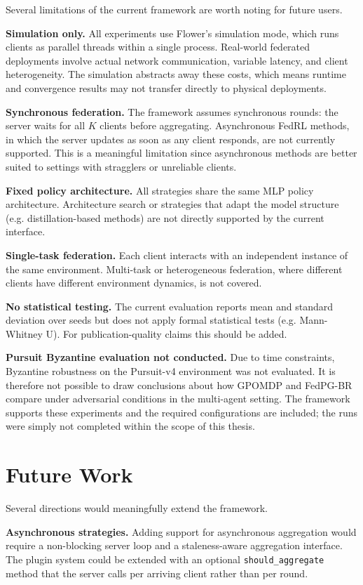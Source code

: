\documentclass[a4paper, oneside]{discothesis}
\begin{document}
Several limitations of the current framework are worth noting for future users.

\textbf{Simulation only.} All experiments use Flower's simulation mode, which runs clients as parallel threads within a single process. Real-world federated deployments involve actual network communication, variable latency, and client heterogeneity. The simulation abstracts away these costs, which means runtime and convergence results may not transfer directly to physical deployments.

\textbf{Synchronous federation.} The framework assumes synchronous rounds: the server waits for all $K$ clients before aggregating. Asynchronous FedRL methods, in which the server updates as soon as any client responds, are not currently supported. This is a meaningful limitation since asynchronous methods are better suited to settings with stragglers or unreliable clients.

\textbf{Fixed policy architecture.} All strategies share the same MLP policy architecture. Architecture search or strategies that adapt the model structure (e.g. distillation-based methods) are not directly supported by the current interface.

\textbf{Single-task federation.} Each client interacts with an independent instance of the same environment. Multi-task or heterogeneous federation, where different clients have different environment dynamics, is not covered.

\textbf{No statistical testing.} The current evaluation reports mean and standard deviation over seeds but does not apply formal statistical tests (e.g. Mann-Whitney U). For publication-quality claims this should be added.

\textbf{Pursuit Byzantine evaluation not conducted.} Due to time constraints, Byzantine robustness on the Pursuit-v4 environment was not evaluated. It is therefore not possible to draw conclusions about how GPOMDP and FedPG-BR compare under adversarial conditions in the multi-agent setting. The framework supports these experiments and the required configurations are included; the runs were simply not completed within the scope of this thesis.

\section{Future Work}

Several directions would meaningfully extend the framework.

\textbf{Asynchronous strategies.} Adding support for asynchronous aggregation would require a non-blocking server loop and a staleness-aware aggregation interface. The plugin system could be extended with an optional \texttt{should\_aggregate} method that the server calls per arriving client rather than per round.
\end{document}
